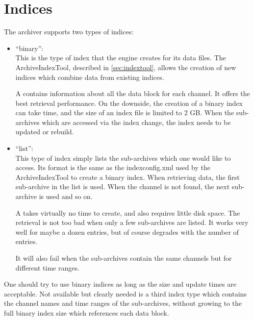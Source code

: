 \chapter{Indices} \label{chap:indices}
The archiver supports two types of indices:
\begin{itemize}
\item ``binary'':\\
      This is the type of index that the engine creates for its data
      files. The ArchiveIndexTool, described in \ref{sec:indextool},
      allows the creation of new indices which combine data from
      existing indices.

      A  contains information about all the data block for
      each channel. It offers the best retrieval performance.  On the
      downside, the creation of a binary index can take time, and the
      size of an index file is limited to 2 GB. When the sub-archives
      which are accessed via the index change, the index needs to be
      updated or rebuild.
\item ``list'':\\
      This type of index simply lists the sub-archives which one would
      like to access. Its format is the same as the indexconfig.xml
      used by the ArchiveIndexTool to create a binary index.
      When retrieving data, the first sub-archive in the list is
      used. When the channel is not found, the next sub-archive is
      used and so on.

      A  takes virtually no time to create, and also
      requires little disk space. The retrieval is not too bad when
      only a few sub-archives are listed. It works very well for
      maybe a dozen entries, but of course degrades with
      the number of entries.

      It will also fail when the sub-archives contain the same
      channels but for different time ranges.
\end{itemize}

\noindent One should try to use binary indices as long as the size and update times
are acceptable.
Not available but clearly needed is a third index type which contains
the channel names and time ranges of the sub-archives, without growing
to the full binary index size which references each data block.

